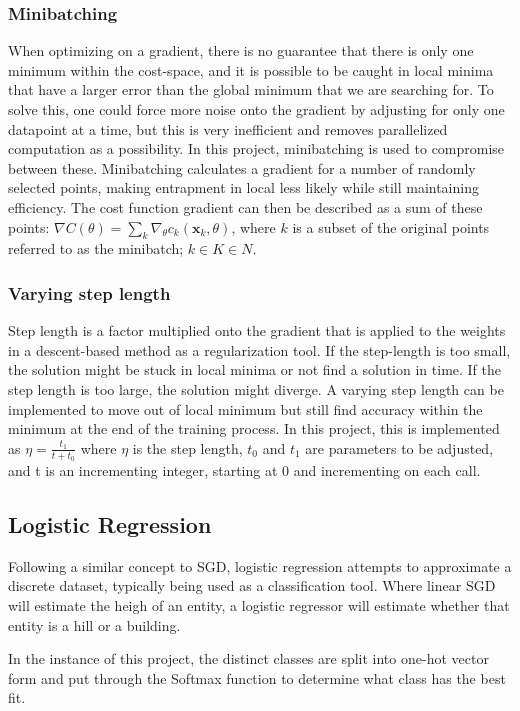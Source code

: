 \documentclass[a4paper, UKenglish]{article}
\newcommand{\0}{\mathbf{0}}
\newcommand{\1}{\mathbf{1}}
\begin{document}
\subsubsection{Minibatching}
When optimizing on a gradient, there is no guarantee that there is only one minimum within the cost-space, and it is possible to be caught in local minima that have a larger error than the global minimum that we are searching for. To solve this, one could force more noise onto the gradient by adjusting for only one datapoint at a time, but this is very inefficient and removes parallelized computation as a possibility. In this project, minibatching is used to compromise between these. Minibatching calculates a gradient for a number of randomly selected points, making entrapment in local less likely while still maintaining efficiency. The cost function gradient can then be described as a sum of these points: $\nabla C(\theta) = \sum\limits_{k} \nabla_\theta c_k(\textbf{x}_k,\theta)$, where $k$ is a subset of the original points referred to as the minibatch; $k\in K \in N$.

\subsubsection{Varying step length} \label{sec:varying step length}
Step length is a factor multiplied onto the gradient that is applied to the weights in a descent-based method as a regularization tool. If the step-length is too small, the solution might be stuck in local minima or not find a solution in time. If the step length is too large, the solution might diverge. A varying step length can be implemented to move out of local minimum but still find accuracy within the minimum at the end of the training process. In this project, this is implemented as $\eta = \frac{t_1}{t + t_0}$ where $\eta$ is the step length, $t_0$ and $t_1$ are parameters to be adjusted, and t is an incrementing integer, starting at 0 and incrementing on each call.


\subsection{Logistic Regression}
Following a similar concept to SGD, logistic regression attempts to approximate a discrete dataset, typically being used as a classification tool. Where linear SGD will estimate the heigh of an entity, a logistic regressor will estimate whether that entity is a hill or a building. 

In the instance of this project, the distinct classes are split into one-hot vector form and put through the Softmax function to determine what class has the best fit.
\end{document}
